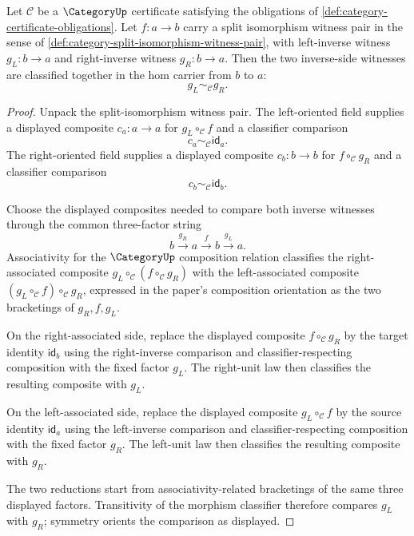 \begin{theorem}
\label{thm:category-split-isomorphism-inverse-witnesses-coincide}
Let $\mathcal C$ be a $\CategoryUp$ certificate satisfying the obligations of
\autoref{def:category-certificate-obligations}. Let $f:a\to b$ carry a split
isomorphism witness pair in the sense of
\autoref{def:category-split-isomorphism-witness-pair}, with left-inverse
witness $g_L:b\to a$ and right-inverse witness $g_R:b\to a$. Then the two
inverse-side witnesses are classified together in the hom carrier from $b$ to
$a$:
$$
g_L\sim_{\mathcal C}g_R.
$$
\end{theorem}
\begin{proof}
Unpack the split-isomorphism witness pair. The left-oriented field supplies a
displayed composite $c_a:a\to a$ for $g_L\circ_{\mathcal C} f$ and a
classifier comparison
$$
c_a\sim_{\mathcal C}\mathsf{id}_a.
$$
The right-oriented field supplies a displayed composite $c_b:b\to b$ for
$f\circ_{\mathcal C}g_R$ and a classifier comparison
$$
c_b\sim_{\mathcal C}\mathsf{id}_b.
$$

Choose the displayed composites needed to compare both inverse witnesses
through the common three-factor string
$$
b\xrightarrow{g_R}a\xrightarrow{f}b\xrightarrow{g_L}a.
$$
Associativity for the $\CategoryUp$ composition relation classifies the
right-associated composite $g_L\circ_{\mathcal C}(f\circ_{\mathcal C}g_R)$
with the left-associated composite $(g_L\circ_{\mathcal C}f)\circ_{\mathcal C}
g_R$, expressed in the paper's composition orientation as the two bracketings
of $g_R,f,g_L$.

On the right-associated side, replace the displayed composite
$f\circ_{\mathcal C}g_R$ by the target identity $\mathsf{id}_b$ using the
right-inverse comparison and classifier-respecting composition with the fixed
factor $g_L$. The right-unit law then classifies the resulting composite with
$g_L$.

On the left-associated side, replace the displayed composite
$g_L\circ_{\mathcal C}f$ by the source identity $\mathsf{id}_a$ using the
left-inverse comparison and classifier-respecting composition with the fixed
factor $g_R$. The left-unit law then classifies the resulting composite with
$g_R$.

The two reductions start from associativity-related bracketings of the same
three displayed factors. Transitivity of the morphism classifier therefore
compares $g_L$ with $g_R$; symmetry orients the comparison as displayed.
\end{proof}
